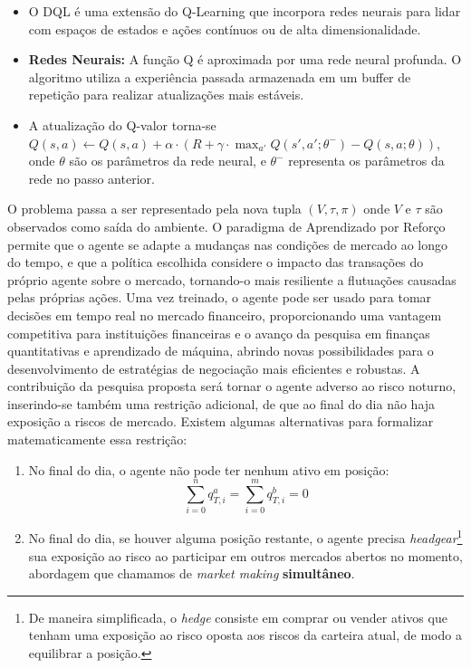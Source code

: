 \begin{itemize}
	\begin{itemize}
		\item O DQL é uma extensão do Q-Learning que incorpora redes neurais para lidar com espaços de estados e ações contínuos ou de alta dimensionalidade.
		\item \textbf{Redes Neurais:} A função Q é aproximada por uma rede neural profunda. O algoritmo utiliza a experiência passada armazenada em um buffer de repetição para realizar atualizações mais estáveis.
		\item A atualização do Q-valor torna-se \(Q(s, a) \leftarrow Q(s, a) + \alpha \cdot (R + \gamma \cdot \max_{a'} Q(s', a'; \theta^-) - Q(s, a; \theta))\), onde \(\theta\) são os parâmetros da rede neural, e \(\theta^-\) representa os parâmetros da rede no passo anterior.
	\end{itemize}
\end{itemize}

O problema passa a ser representado pela nova tupla $(V, \tau, \pi)$ onde $V$ e $\tau$ são observados como saída do ambiente. O paradigma de Aprendizado por Reforço permite que o agente se adapte a mudanças nas condições de mercado ao longo do tempo, e que a política escolhida considere o impacto das transações do próprio agente sobre o mercado, tornando-o mais resiliente a flutuações causadas pelas próprias ações. Uma vez treinado, o agente pode ser usado para tomar decisões em tempo real no mercado financeiro, proporcionando uma vantagem competitiva para instituições financeiras e o avanço da pesquisa em finanças quantitativas e aprendizado de máquina, abrindo novas possibilidades para o desenvolvimento de estratégias de negociação mais eficientes e robustas. A contribuição da pesquisa proposta será tornar o agente adverso ao risco noturno, inserindo-se também uma restrição adicional, de que ao final do dia não haja exposição a riscos de mercado. 
Existem algumas alternativas para formalizar matematicamente essa restrição:
\begin{enumerate}
    \item No final do dia, o agente não pode ter nenhum ativo em posição: 
    \begin{equation} \label{overnight_restriction}
        \sum_{i = 0}^{n} q_{T, i}^{a}  = \sum_{i=0}^{m} q_{T, i}^{b} = 0
    \end{equation}
    \item No final do dia, se houver alguma posição restante, o agente precisa \textit{headgear}\footnote{De maneira simplificada, o \textit{hedge} consiste em comprar ou vender ativos que tenham uma exposição ao risco oposta aos riscos da carteira atual, de modo a equilibrar a posição.} sua exposição ao risco ao participar em outros mercados abertos no momento, abordagem que chamamos de \textit{market making} \textbf{simultâneo}.
\end{enumerate}
